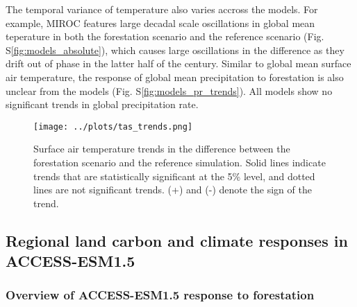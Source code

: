 \documentclass[]{article}
\begin{document}
The temporal variance of temperature also varies accross the models.
For example, MIROC features large decadal scale oscillations in global mean teperature in both the forestation scenario and the reference scenario (Fig. S\ref{fig:models_absolute}), which causes large oscillations in the difference as they drift out of phase in the latter half of the century.
Similar to global mean surface air temperature, the response of global mean precipitation to forestation is also unclear from the models (Fig. S\ref{fig:models_pr_trends}).
All models show no significant trends in global precipitation rate.

\begin{figure}[H]
    \centering
    \texttt{[image: ../plots/tas\_trends.png]}
    \caption{Surface air temperature trends in the difference between the forestation scenario and the reference simulation. Solid lines indicate trends that are statistically significant at the 5\% level, and dotted lines are not significant trends. (+) and (-) denote the sign of the trend.}
    \label{fig:models_tas_trends}
\end{figure}

\subsection{Regional land carbon and climate responses in ACCESS-ESM1.5}

\subsubsection{Overview of ACCESS-ESM1.5 response to forestation}
\end{document}
